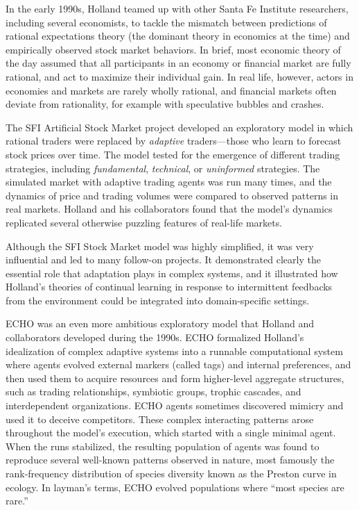 \documentclass{sig-alternate}
\begin{document}
In the early 1990s, Holland teamed up with other Santa Fe Institute researchers,
including several economists, to tackle the mismatch between predictions
of rational expectations theory (the dominant theory in economics at the time) 
and empirically observed stock market behaviors. 
In brief, most
economic theory of the day assumed that all participants in an economy
or financial market are fully rational, and act to maximize their
individual gain.  In real life, however, actors in economies
and markets are rarely wholly rational, and financial markets often deviate
from rationality, for example with speculative bubbles and crashes.

The SFI Artificial Stock Market project \cite{Arthur1997b,Palmer1994}
developed an exploratory model in which rational
traders were replaced by \emph{adaptive} traders---those who learn to
forecast stock prices over time.  The model tested for the
emergence of different trading strategies, including
\emph{fundamental}, \emph{technical}, or \emph{uninformed}
strategies. The simulated market with adaptive trading agents was run
many times, and the dynamics of price and trading volumes were
compared to observed patterns in real markets.  Holland and his
collaborators found that the model's dynamics replicated several
otherwise puzzling features of real-life markets.

Although the SFI Stock Market model was highly simplified, it was very
influential and led to many follow-on projects.  It 
demonstrated clearly the essential role that adaptation plays in complex
systems, and it illustrated how Holland's theories of continual learning
in response to intermittent feedbacks from the environment could be
integrated into domain-specific settings.

ECHO \cite{Holland1999,Hraber1997} was an even more ambitious exploratory model
that Holland and collaborators developed during the 1990s. 
ECHO formalized Holland's idealization of complex adaptive systems
into a runnable computational system where agents evolved external
markers (called tags) and internal preferences, and then used them to
acquire resources and form higher-level aggregate structures, such as
trading relationships, symbiotic groups, trophic cascades, and
interdependent organizations.  ECHO agents sometimes discovered
mimicry and used it to deceive competitors.  These complex interacting
patterns arose throughout the model's execution, which started with a single
minimal agent.
When the runs stabilized, the resulting population of agents was
found to reproduce several well-known patterns observed in nature,
most famously the rank-frequency distribution of species diversity
known as the Preston curve in ecology.  In layman's terms, ECHO
evolved populations where ``most species are rare.''
\end{document}
